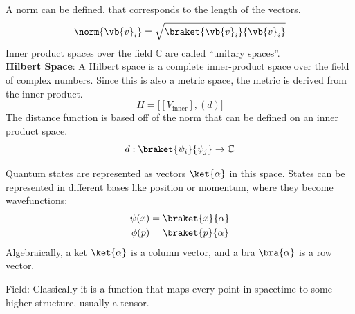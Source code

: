 A norm can be defined, that corresponds to the length of the vectors. 
\begin{equation*}
	\norm{\vb{v}_i}=\sqrt{\braket{\vb{v}_i}{\vb{v}_i}}
\end{equation*}
Inner product spaces over the field \(\mathbb{C}\) are called ``unitary spaces''.
\\
\textbf{Hilbert Space}: A Hilbert space is a complete inner-product space over the field of complex numbers. Since this is also a metric space, the metric is derived from the inner product.
\[H=\big[[V_{\text{inner}}],(d)\big]\]
The distance function is based off of the norm that can be defined on an inner product space.
\begin{equation*}
	d:\braket{\psi_i}{\psi_j}\rightarrow\mathbb{C}
\end{equation*}

Quantum states are represented as vectors \(\ket{\alpha}\) in this space. States can be represented in different bases like position or momentum, where they become wavefunctions:
\begin{align*}
	\psi(x)&=\braket{x}{\alpha}	
	\\
	\phi(p)&=\braket{p}{\alpha}
\end{align*}
Algebraically, a ket \(\ket{\alpha}\) is a column vector, and a bra \(\bra{\alpha}\) is a row vector. 

\newpage

Field: Classically it is a function that maps every point in spacetime to some higher structure, usually a tensor.